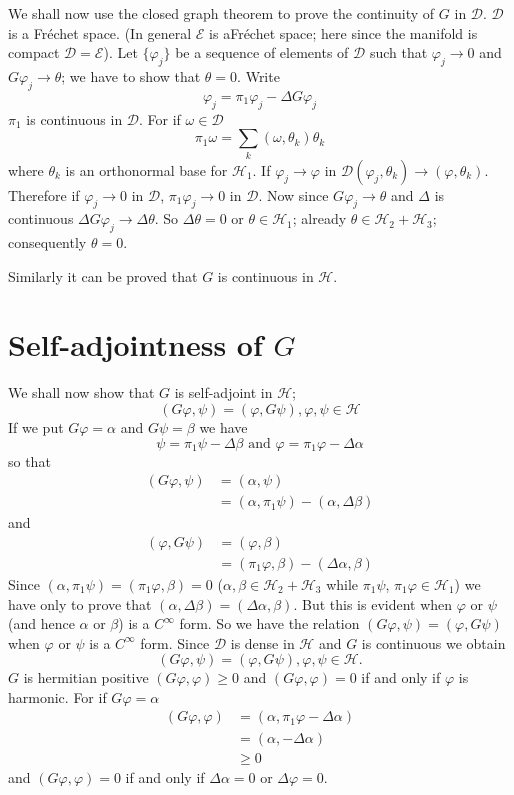 We shall now use the closed graph theorem to prove the continuity of
$G$ in $\mathscr{D}$. $\mathscr{D}$ is a Fr\'echet space. (In general
$\mathscr{E}$ is a\pageoriginale Fr\'echet space; here since the
manifold is compact $\mathscr{D}=\mathscr{E}$). Let $\{\varphi_{j}\}$
be a sequence of elements of $\mathscr{D}$ such that $\varphi_{j}\to
0$ and $G\varphi_{j}\to \theta$; we have to show that
$\theta=0$. Write
$$
\varphi_{j}=\pi_{1}\varphi_{j}-\Delta G\varphi_{j}
$$
$\pi_{1}$ is continuous in $\mathscr{D}$. For if
$\omega\in\mathscr{D}$
$$
\pi_{1}\omega=\sum_{k}(\omega,\theta_{k})\theta_{k}
$$
where $\theta_{k}$ is an orthonormal base for $\mathscr{H}_{1}$. If
$\varphi_{j}\to \varphi$ in $\mathscr{D}(\varphi_{j},\theta_{k})\to
(\varphi,\theta_{k})$. Therefore if $\varphi_{j}\to 0$ in
$\mathscr{D}$, $\pi_{1}\varphi_{j}\to 0$ in $\mathscr{D}$. Now since
$G\varphi_{j}\to \theta$ and $\Delta$ is continuous $\Delta
G\varphi_{j}\to \Delta\theta$. So $\Delta\theta=0$ or $\theta\in
\mathscr{H}_{1}$; already $\theta\in\mathscr{H}_{2}+\mathscr{H}_{3}$;
consequently $\theta=0$.

Similarly it can be proved that $G$ is continuous in $\mathscr{H}$.

\section*{Self-adjointness of $G$}

We shall now show that $G$ is self-adjoint in $\mathscr{H}$;
$$
(G\varphi,\psi)=(\varphi,G\psi),\varphi,\psi\in \mathscr{H}
$$
If we put $G\varphi=\alpha$ and $G\psi=\beta$ we have
$$
\psi=\pi_{1}\psi-\Delta\beta\text{ \ and
  \ }\varphi=\pi_{1}\varphi-\Delta\alpha
$$
so that
\begin{align*}
(G\varphi,\psi) &= (\alpha, \psi)\\
&= (\alpha,\pi_{1}\psi)-(\alpha,\Delta\beta)
\end{align*}
and\pageoriginale
\begin{align*}
(\varphi,G\psi) &= (\varphi,\beta)\\
&= (\pi_{1}\varphi,\beta)-(\Delta\alpha,\beta)
\end{align*}
Since $(\alpha,\pi_{1}\psi)=(\pi_{1}\varphi,\beta)=0$
($\alpha,\beta\in\mathscr{H}_{2}+\mathscr{H}_{3}$ while $\pi_{1}\psi$,
$\pi_{1}\varphi\in\mathscr{H}_{1}$) we have only to prove that
$(\alpha,\Delta\beta)=(\Delta\alpha,\beta)$. But this is evident when
$\varphi$ or $\psi$ (and hence $\alpha$ or $\beta$) is a $C^{\infty}$
form. So we have the relation $(G\varphi,\psi)=(\varphi,G\psi)$ when
$\varphi$ or $\psi$ is a $C^{\infty}$ form. Since $\mathscr{D}$ is
dense in $\mathscr{H}$ and $G$ is continuous we obtain
$$
(G\varphi,\psi)=(\varphi,G\psi),\varphi,\psi\in\mathscr{H}.
$$
$G$ is hermitian positive $(G\varphi,\varphi)\geq 0$ and
$(G\varphi,\varphi)=0$ if and only if $\varphi$ is harmonic. For if
$G\varphi=\alpha$ 
\begin{align*}
(G\varphi,\varphi) &= (\alpha,\pi_{1}\varphi-\Delta\alpha)\\
 &=(\alpha,-\Delta\alpha)\\
 &\geq 0
\end{align*}
and $(G\varphi,\varphi)=0$ if and only if $\Delta\alpha=0$ or
$\Delta\varphi=0$. 
